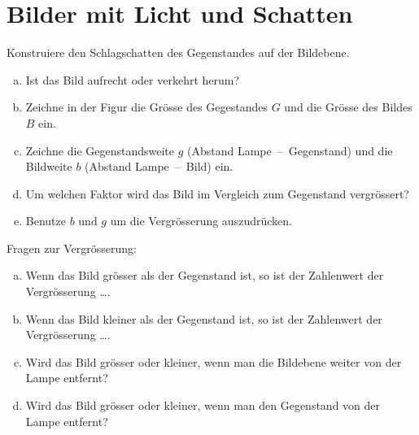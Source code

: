 \documentclass[paper=a4,twoside=true,,DIV13,BCOR1cm]{scrartcl}
\begin{document}
\section{Bilder mit Licht und Schatten}
\begin{aufgabe}
	Konstruiere den Schlagschatten des Gegenstandes auf der Bildebene.


\begin{enumerate}[a)]
	\item Ist das Bild aufrecht oder verkehrt herum?
	\item Zeichne in der Figur die Grösse des Gegestandes $G$ und die Grösse des Bildes $B$ ein.
	\item Zeichne die Gegenstandsweite $g$ (Abstand Lampe\ --\ Gegenstand) und die Bildweite $b$
		(Abstand Lampe\ --\ Bild) ein.
	\item Um welchen Faktor wird das Bild im Vergleich zum Gegenstand vergrössert?
	\item Benutze $b$ und $g$ um die Vergrösserung auszudrücken.
\end{enumerate}
\end{aufgabe}


\newpage


\begin{aufgabe}
	Fragen zur Vergrösserung:
	\begin{enumerate}[a)]
		\item Wenn das Bild grösser als der Gegenstand ist, so ist der Zahlenwert der Vergrösserung \ldots.
		\item Wenn das Bild kleiner als der Gegenstand ist, so ist der Zahlenwert der Vergrösserung \ldots.
		\item Wird das Bild grösser oder kleiner, wenn man die Bildebene weiter von der Lampe entfernt?
		\item Wird das Bild grösser oder kleiner, wenn man den Gegenstand von der Lampe entfernt?
	\end{enumerate}
\end{aufgabe}
\end{document}
